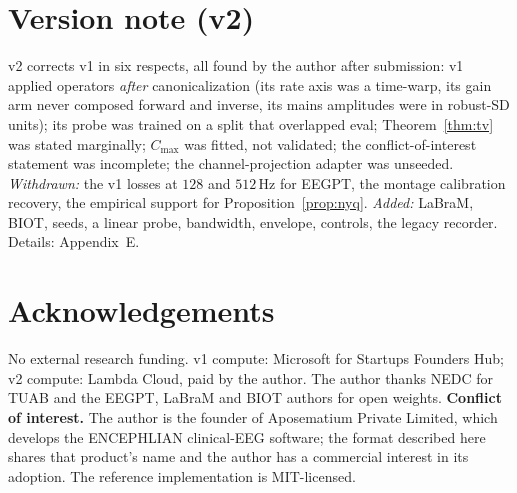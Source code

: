 \documentclass[conference]{IEEEtran}
\begin{document}
\section*{Version note (v2)}
\label{sec:version}
v2 corrects v1 in six respects, all found by the author after
submission: v1 applied operators \emph{after} canonicalization (its
rate axis was a time-warp, its gain arm never composed forward and
inverse, its mains amplitudes were in robust-SD units); its probe was
trained on a split that overlapped eval; Theorem~\ref{thm:tv} was
stated marginally; $C_{\max}$ was fitted, not validated; the
conflict-of-interest statement was incomplete; the channel-projection
adapter was unseeded. \emph{Withdrawn:} the v1 losses at $128$ and
$512$\,Hz for EEGPT, the montage calibration recovery, the empirical
support for Proposition~\ref{prop:nyq}. \emph{Added:} LaBraM, BIOT,
seeds, a linear probe, bandwidth, envelope, controls, the legacy
recorder. Details: Appendix~E.

\section*{Acknowledgements}
No external research funding. v1 compute: Microsoft for Startups
Founders Hub; v2 compute: Lambda Cloud, paid by the author. The author
thanks NEDC for TUAB and the EEGPT, LaBraM and BIOT authors for open
weights. \textbf{Conflict of interest.} The author is the founder of
Aposematium Private Limited, which develops the ENCEPHLIAN clinical-EEG
software; the format described here shares that product's name and the
author has a commercial interest in its adoption. The reference
implementation is MIT-licensed.



\end{document}
